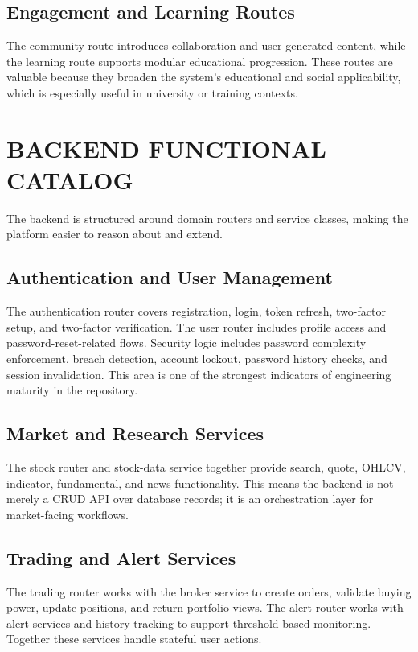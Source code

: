 \documentclass[12pt,a4paper]{report}
\begin{document}
\subsection{Engagement and Learning Routes}
The community route introduces collaboration and user-generated content, while the learning route supports modular educational progression. These routes are valuable because they broaden the system's educational and social applicability, which is especially useful in university or training contexts.

\section{BACKEND FUNCTIONAL CATALOG}
The backend is structured around domain routers and service classes, making the platform easier to reason about and extend.

\subsection{Authentication and User Management}
The authentication router covers registration, login, token refresh, two-factor setup, and two-factor verification. The user router includes profile access and password-reset-related flows. Security logic includes password complexity enforcement, breach detection, account lockout, password history checks, and session invalidation. This area is one of the strongest indicators of engineering maturity in the repository.

\subsection{Market and Research Services}
The stock router and stock-data service together provide search, quote, OHLCV, indicator, fundamental, and news functionality. This means the backend is not merely a CRUD API over database records; it is an orchestration layer for market-facing workflows.

\subsection{Trading and Alert Services}
The trading router works with the broker service to create orders, validate buying power, update positions, and return portfolio views. The alert router works with alert services and history tracking to support threshold-based monitoring. Together these services handle stateful user actions.
\end{document}
